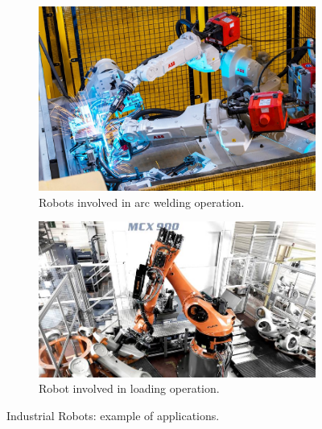 \begin{figure}[htb]
    \centering
    \begin{subfigure}[b]{0.45\textwidth}
        \includegraphics[width=\textwidth]{figures/images/welding.jpg}
        \caption{Robots involved in arc welding operation.}
        \label{fig:welding}
    \end{subfigure}
    \hfill
    \begin{subfigure}[b]{0.5\textwidth}
        \includegraphics[width=\textwidth]{figures/images/loading.jpg}
        \caption{Robot involved in loading operation.}
        \label{fig:material_handling}
    \end{subfigure}
   \hfill
   \caption{Industrial Robots: example of applications.}
   \label{fig:industrial_robots_example}
\end{figure}

